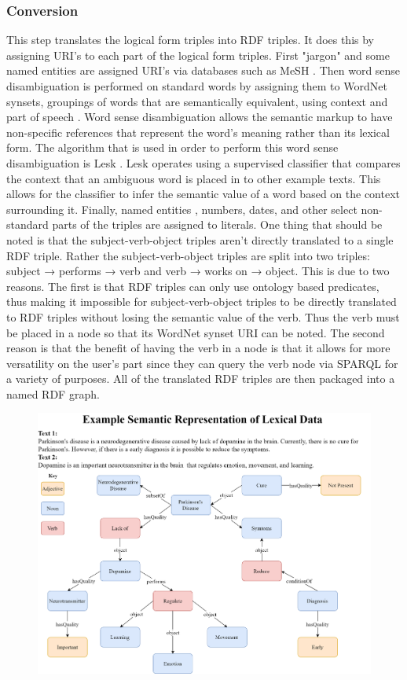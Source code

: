 \documentclass[12pt]{article}
\begin{document}
	\subsubsection{Conversion} 
	\quad This step translates the logical form triples into RDF triples. It does this by assigning URI's to each part of the logical form triples. First "jargon" and some named entities are assigned URI's via databases such as MeSH \cite{lowe1994understanding}. Then word sense disambiguation is performed on standard words by assigning them to WordNet synsets, groupings of words that are semantically equivalent, using context and part of speech \cite{miller1995wordnet}. Word sense disambiguation allows the semantic markup to have non-specific references that represent the word’s meaning rather than its lexical form.  The algorithm that is used in order to perform this word sense disambiguation is Lesk \cite{banerjee2002adapted}. Lesk operates using a supervised classifier that compares the context that an ambiguous word is placed in to other example texts. This allows for the classifier to infer the semantic value of a word based on the context surrounding it.  Finally, named entities , numbers, dates, and other select non-standard parts of the triples are assigned to literals. One thing that should be noted is that the subject-verb-object triples aren’t directly translated to a single RDF triple. Rather the subject-verb-object triples are split into two triples: subject → performs → verb and verb → works on → object. This is due to two reasons. The first is that RDF triples can only use ontology based predicates, thus making it impossible for subject-verb-object triples to be directly translated to RDF triples without losing the semantic value of the verb. Thus the verb must be placed in a node so that its WordNet synset URI can be noted. The second reason is that the benefit of having the verb in a node is that it allows for more versatility on the user’s part since they can query the verb node via SPARQL for a variety of purposes. All of the translated RDF triples are then packaged into a named RDF graph.
	\begin{figure}[h!]
		\centering
		\includegraphics[scale=0.18]{ExampleRepresentation_vJSHS2.0}
	\end{figure}
	
\end{document}
